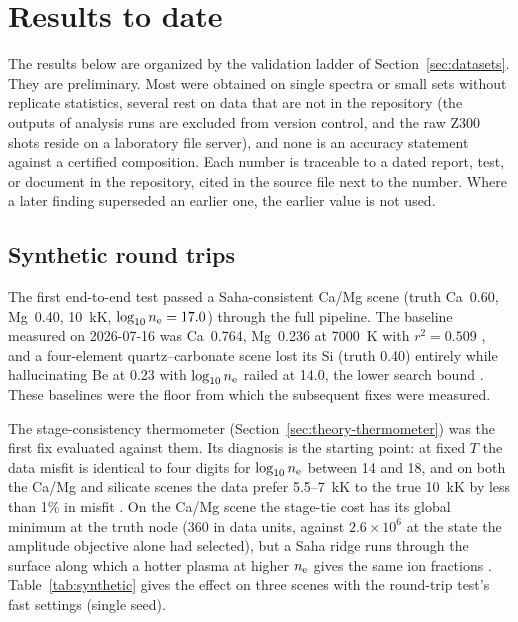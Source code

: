 \section{Results to date}
\label{sec:results}

The results below are organized by the validation ladder of Section~\ref{sec:datasets}. They are preliminary. Most were obtained on single spectra or small sets without replicate statistics, several rest on data that are not in the repository (the outputs of analysis runs are excluded from version control, and the raw Z300 shots reside on a laboratory file server), and none is an accuracy statement against a certified composition. Each number is traceable to a dated report, test, or document in the repository, cited in the source file next to the number. Where a later finding superseded an earlier one, the earlier value is not used.

\subsection{Synthetic round trips}

The first end-to-end test passed a Saha-consistent Ca/Mg scene (truth Ca~0.60, Mg~0.40, \SI{10}{\kilo\kelvin}, $\log_{10}n_{\mathrm{e}}=17.0$) through the full pipeline. The baseline measured on 2026-07-16 was Ca~0.764, Mg~0.236 at \SI{7000}{\kelvin} with $r^2=0.509$ %
, and a four-element quartz--carbonate scene lost its Si (truth 0.40) entirely while hallucinating Be at 0.23 with $\log_{10}n_{\mathrm{e}}$ railed at 14.0, the lower search bound %
. These baselines were the floor from which the subsequent fixes were measured.

The stage-consistency thermometer (Section~\ref{sec:theory-thermometer}) was the first fix evaluated against them. Its diagnosis is the starting point: at fixed $T$ the data misfit is identical to four digits for $\log_{10}n_{\mathrm{e}}$ between 14 and 18, and on both the Ca/Mg and silicate scenes the data prefer 5.5--\SI{7}{\kilo\kelvin} to the true \SI{10}{\kilo\kelvin} by less than 1\% in misfit %
. On the Ca/Mg scene the stage-tie cost has its global minimum at the truth node (360 in data units, against $2.6\times10^6$ at the state the amplitude objective alone had selected), but a Saha ridge runs through the surface along which a hotter plasma at higher $n_{\mathrm{e}}$ gives the same ion fractions %
. Table~\ref{tab:synthetic} gives the effect on three scenes with the round-trip test's fast settings (single seed).

